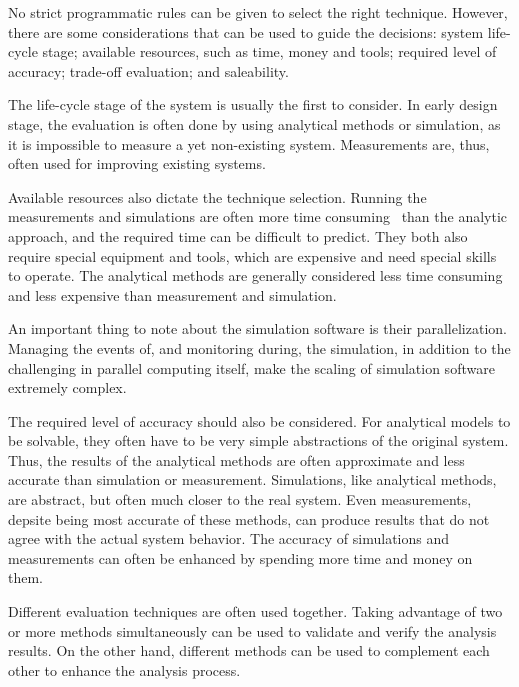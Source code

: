 No strict programmatic rules can be given to select the right technique. However, there are some considerations that can be used to guide the decisions: system life-cycle stage; available resources, such as time, money and tools; required level of accuracy; trade-off evaluation; and saleability.~\cite{jain:1991:AOCSPA}

The life-cycle stage of the system is usually the first to consider. In early design stage, the evaluation is often done by using analytical methods or simulation, as it is impossible to measure a yet non-existing system. Measurements are, thus, often used for improving existing systems.~\cite{jain:1991:AOCSPA}

Available resources also dictate the technique selection. Running the measurements and simulations are often more time consuming~\cite{Fujimoto:1990:PDE} than the analytic approach, and the required time can be difficult to predict. They both also require special equipment and tools, which are expensive and need special skills to operate. The analytical methods are generally considered less time consuming and less expensive than measurement and simulation.~\cite{jain:1991:AOCSPA}

An important thing to note about the simulation software is their parallelization. Managing the events of, and monitoring during, the simulation, in addition to the challenging in parallel computing itself, make the scaling of simulation software extremely complex.~\cite{Fujimoto:1990:PDE}

The required level of accuracy should also be considered. For analytical models to be solvable, they often have to be very simple abstractions of the original system. Thus, the results of the analytical methods are often approximate and less accurate than simulation or measurement. Simulations, like analytical methods, are abstract, but often much closer to the real system. Even measurements, depsite being most accurate of these methods, can produce results that do not agree with the actual system behavior. The accuracy of simulations and measurements can often be enhanced by spending more time and money on them.~\cite{jain:1991:AOCSPA}

Different evaluation techniques are often used together. Taking advantage of two or more methods simultaneously can be used to validate and verify the analysis results. On the other hand, different methods can be used to complement each other to enhance the analysis process.~\cite{jain:1991:AOCSPA}

